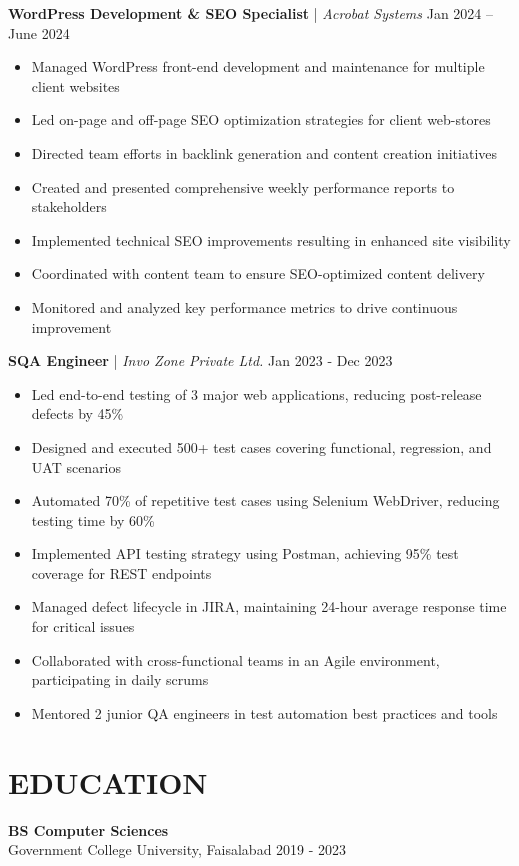 \documentclass[11pt,a4paper]{article}
\newcommand{\role}[2]{{\textbf{#1}} | \textit{#2}}
\newcommand{\daterange}[1]{{\color{secondary}#1}}
\begin{document}
\role{WordPress Development \& SEO Specialist}{Acrobat Systems} \daterange{Jan 2024 – June 2024}
\begin{itemize}[leftmargin=*,nosep]
\item Managed WordPress front-end development and maintenance for multiple client websites
\item Led on-page and off-page SEO optimization strategies for client web-stores
\item Directed team efforts in backlink generation and content creation initiatives
\item Created and presented comprehensive weekly performance reports to stakeholders
\item Implemented technical SEO improvements resulting in enhanced site visibility
\item Coordinated with content team to ensure SEO-optimized content delivery
\item Monitored and analyzed key performance metrics to drive continuous improvement
\end{itemize}

\role{SQA Engineer}{Invo Zone Private Ltd.} \daterange{Jan 2023 - Dec 2023}
\begin{itemize}[leftmargin=*,nosep]
\item Led end-to-end testing of 3 major web applications, reducing post-release defects by 45\%
\item Designed and executed 500+ test cases covering functional, regression, and UAT scenarios
\item Automated 70\% of repetitive test cases using Selenium WebDriver, reducing testing time by 60\%
\item Implemented API testing strategy using Postman, achieving 95\% test coverage for REST endpoints
\item Managed defect lifecycle in JIRA, maintaining 24-hour average response time for critical issues
\item Collaborated with cross-functional teams in an Agile environment, participating in daily scrums
\item Mentored 2 junior QA engineers in test automation best practices and tools
\end{itemize}

\section*{EDUCATION}
\textbf{BS Computer Sciences}\\
Government College University, Faisalabad \daterange{2019 - 2023}
\end{document}
